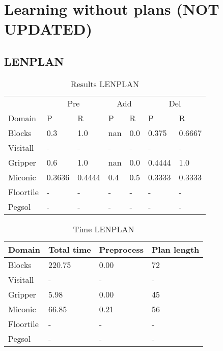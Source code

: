 \documentclass[]{article}
\begin{document}
\section{Learning without plans (NOT UPDATED)}
\subsection{LENPLAN}
\begin{table}[H]
	\caption{Results LENPLAN}
	\label{tab:results_lenplan}
	\begin{center}
		\begin{tabular}{l|l|l|l|l|l|l|}
			& \multicolumn{2}{|c|}{Pre} & \multicolumn{2}{|c|}{Add} & \multicolumn{2}{|c|}{Del}  \\ \cline{2-7}			 
			Domain & P & R & P & R & P & R \\
			\hline
			Blocks & 0.3 & 1.0 & nan & 0.0 & 0.375 & 0.6667 \\
			Visitall & - & - & - & - & - & - \\
			Gripper & 0.6 & 1.0 & nan & 0.0 & 0.4444 & 1.0 \\
			Miconic & 0.3636 & 0.4444 & 0.4 & 0.5 & 0.3333 & 0.3333 \\
			Floortile & - & - & - & - & - & - \\
			Pegsol & - & - & - & - & - & - \\
		\end{tabular}
	\end{center}	
\end{table}

\begin{table}[H]
	\caption{Time LENPLAN}
	\label{tab:time_lenplan}
	\begin{center}
		\begin{tabular}{l|l|l|l|}			 
			Domain & Total time & Preprocess & Plan length  \\
			\hline
			Blocks & 220.75 & 0.00 & 72  \\
			Visitall & - & - & -  \\
			Gripper & 5.98 & 0.00 & 45  \\
			Miconic & 66.85 & 0.21 & 56  \\
			Floortile & - & - & - \\
			Pegsol & - & - & - \\
		\end{tabular}
	\end{center}	
\end{table}
\end{document}
